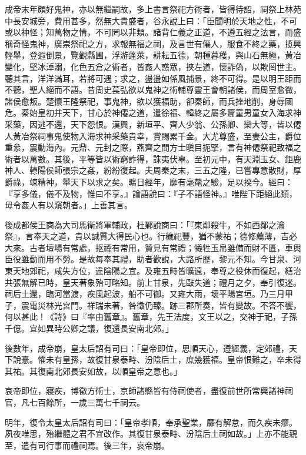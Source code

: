 \begin{pinyinscope}
成帝末年頗好鬼神，亦以無繼嗣故，多上書言祭祀方術者，皆得待詔，祠祭上林苑中長安城旁，費用甚多，然無大貴盛者，谷永說上曰：「臣聞明於天地之性，不可或以神怪；知萬物之情，不可罔以非類。諸背仁義之正道，不遵五經之法言，而盛稱奇怪鬼神，廣崇祭祀之方，求報無福之祠，及言世有僊人，服食不終之藥，揽興輕舉，登遐倒景，覽觀縣圃，浮游蓬萊，耕耘五德，朝種暮穫，與山石無極，黃冶變化，堅冰淖溺，化色五倉之術者，皆姦人惑眾，挾左道，懷詐偽，以欺罔世主。聽其言，洋洋滿耳，若將可遇；求之，盪盪如係風捕景，終不可得。是以明王距而不聽，聖人絕而不語。昔周史萇弘欲以鬼神之術輔尊靈王會朝諸侯，而周室愈微，諸侯愈叛。楚懷王隆祭祀，事鬼神，欲以獲福助，卻秦師，而兵挫地削，身辱國危。秦始皇初并天下，甘心於神僊之道，遣徐福、韓終之屬多齎童男童女入海求神采藥，因逃不還，天下怨恨。漢興，新垣平、齊人少翁、公孫卿、欒大等，皆以僊人黃冶祭祠事鬼使物入海求神采藥貴幸，賞賜累千金。大尤尊盛，至妻公主，爵位重絫，震動海內。元鼎、元封之際，燕齊之間方士瞋目扼掔，言有神僊祭祀致福之術者以萬數。其後，平等皆以術窮詐得，誅夷伏辜。至初元中，有天淵玉女、鉅鹿神人、轑陽侯師張宗之姦，紛紛復起。夫周秦之末，三五之隆，已嘗專意散財，厚爵祿，竦精神，舉天下以求之矣。曠日經年，靡有毫氂之驗，足以揆今。經曰：『享多儀，儀不及物，惟曰不享。』論語說曰：『子不語怪神。』唯陛下距絕此類，毋令姦人有以窺朝者。」上善其言。

後成都侯王商為大司馬衛將軍輔政，杜鄴說商曰：「『東鄰殺牛，不如西鄰之瀹祭』，言奉天之道，貴以誠質大得民心也。行穢祀豐，猶不蒙祐；德修薦薄，吉必大來。古者壇場有常處，抠禋有常用，贊見有常禮；犧牲玉帛雖備而財不匱，車輿臣役雖動而用不勞。是故每奉其禮，助者歡說，大路所歷，黎元不知。今甘泉、河東天地郊祀，咸失方位，違陰陽之宜。及雍五畤皆曠遠，奉尊之役休而復起，繕治共張無解已時，皇天著象殆可略知。前上甘泉，先敺失道；禮月之夕，奉引復迷。祠后土還，臨河當渡，疾風起波，船不可御。又雍大雨，壞平陽宮垣。乃三月甲子，震電災林光宮門。祥瑞未著，咎徵仍臻。跡三郡所奏，皆有變故。不答不饗，何以甚此！《詩》曰『率由舊章』。舊章，先王法度，文王以之，交神于祀，子孫千億。宜如異時公卿之議，復還長安南北郊。」

後數年，成帝崩，皇太后詔有司曰：「皇帝即位，思順天心，遵經義，定郊禮，天下說憙。懼未有皇孫，故復甘泉泰畤、汾陰后土，庶幾獲福。皇帝恨難之，卒未得其祐。其復南北郊長安如故，以順皇帝之意也。」

哀帝即位，寢疾，博徵方術士，京師諸縣皆有侍祠使者，盡復前世所常興諸神祠官，凡七百餘所，一歲三萬七千祠云。

明年，復令太皇太后詔有司曰：「皇帝孝順，奉承聖業，靡有解怠，而久疾未瘳。夙夜唯思，殆繼體之君不宜改作。其復甘泉泰畤、汾陰后土祠如故。」上亦不能親至，遣有司行事而禮祠焉。後三年，哀帝崩。


\end{pinyinscope}
